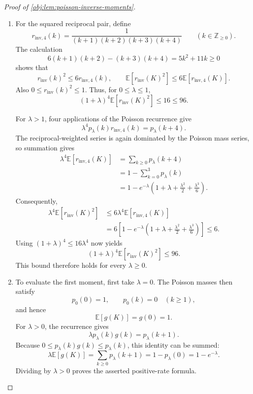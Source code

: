 \documentclass[11pt]{article}
\begin{document}
\begin{proof}[Proof of \cref{obj:lem:poisson-inverse-moments}]
\begin{enumerate}
\item For the squared reciprocal pair, define
\[
r_{\mathrm{inv},4}(k)
=\frac1{(k+1)(k+2)(k+3)(k+4)}
\qquad(k\in\mathbb Z_{\ge0}).
\]
The calculation
\[
6(k+1)(k+2)-(k+3)(k+4)=5k^2+11k\ge0
\]
shows that
\[
r_{\mathrm{inv}}(k)^2\le6r_{\mathrm{inv},4}(k),
\qquad
\mathbb E[r_{\mathrm{inv}}(K)^2]
\le6\mathbb E[r_{\mathrm{inv},4}(K)].
\]
Also \(0\le r_{\mathrm{inv}}(k)^2\le1\). Thus, for \(0\le\lambda\le1\),
\[
(1+\lambda)^4\mathbb E[r_{\mathrm{inv}}(K)^2]
\le16\le96.
\]

For \(\lambda>1\), four applications of the Poisson recurrence give
\[
\lambda^4p_\lambda(k)r_{\mathrm{inv},4}(k)=p_\lambda(k+4).
\]
The reciprocal-weighted series is again dominated by the Poisson mass series, so summation gives
\[
\begin{aligned}
\lambda^4\mathbb E[r_{\mathrm{inv},4}(K)]
&=\sum_{k\ge0}p_\lambda(k+4)\\
&=1-\sum_{k=0}^{3}p_\lambda(k)\\
&=1-e^{-\lambda}
\left(1+\lambda+\frac{\lambda^2}{2}+\frac{\lambda^3}{6}\right).
\end{aligned}
\]
Consequently,
\[
\begin{aligned}
\lambda^4\mathbb E[r_{\mathrm{inv}}(K)^2]
&\le6\lambda^4\mathbb E[r_{\mathrm{inv},4}(K)]\\
&=6\left[
1-e^{-\lambda}
\left(1+\lambda+\frac{\lambda^2}{2}+\frac{\lambda^3}{6}\right)
\right]
\le6.
\end{aligned}
\]
Using \((1+\lambda)^4\le16\lambda^4\) now yields
\[
(1+\lambda)^4\mathbb E[r_{\mathrm{inv}}(K)^2]\le96.
\]
This bound therefore holds for every \(\lambda\ge0\). %

\item To evaluate the first moment, first take \(\lambda=0\). The Poisson masses then satisfy
\[
p_0(0)=1,\qquad p_0(k)=0\quad(k\ge1),
\]
and hence
\[
\mathbb E[g(K)]=g(0)=1.
\]
For \(\lambda>0\), the recurrence gives
\[
\lambda p_\lambda(k)g(k)=p_\lambda(k+1).
\]
Because \(0\le p_\lambda(k)g(k)\le p_\lambda(k)\), this identity can be summed:
\[
\lambda\mathbb E[g(K)]
=\sum_{k\ge0}p_\lambda(k+1)
=1-p_\lambda(0)
=1-e^{-\lambda}.
\]
Dividing by \(\lambda>0\) proves the asserted positive-rate formula. %


\end{enumerate}
\end{proof}
\end{document}
